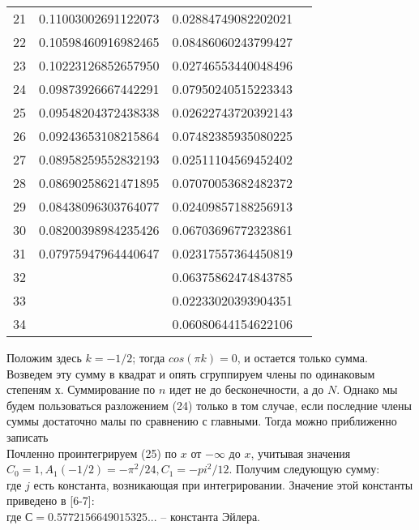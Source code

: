 \begin{table}[]
\begin{center}
\begin{tabular}{|c|c|c|c|}
21 & 0.11003002691122073 & 0.02884749082202021 &                      \\
22 & 0.10598460916982465 & 0.08486060243799427 &                      \\
23 & 0.10223126852657950 & 0.02746553440048496 &                      \\
24 & 0.09873926667442291 & 0.07950240515223343 &                      \\
25 & 0.09548204372438338 & 0.02622743720392143 &                      \\
26 & 0.09243653108215864 & 0.07482385935080225 &                      \\
27 & 0.08958259552832193 & 0.02511104569452402 &                      \\
28 & 0.08690258621471895 & 0.07070053682482372 &                      \\
29 & 0.08438096303764077 & 0.02409857188256913 &                      \\
30 & 0.08200398984235426 & 0.06703696772323861 &                      \\
31 & 0.07975947964440647 & 0.02317557364450819 &                      \\
32 &                     & 0.06375862474843785 &                      \\
33 &                     & 0.02233020393904351 &                      \\
34 &                     & 0.06080644154622106 &                      \\
\hline
\end{tabular}
\end{center}
\end{table}

\begin{equation}
\label{eq:ref_2_6_11}
\end{equation}
Положим здесь $k = -1/2$; тогда $cos(\pi k) = 0$, и остается только сумма. Возведем
эту сумму в квадрат и опять сгруппируем члены по одинаковым степеням $х$.
Суммирование по $n$ идет не до бесконечности, а до $N$. Однако мы будем
пользоваться разложением (24) только в том случае, если последние члены
суммы достаточно малы по сравнению с главными. Тогда можно приближенно
записать
\begin{equation}
\label{eq:ref_2_6_12}
\end{equation}
Почленно проинтегрируем (25) по $x$ от $-\infty$ до $x$, учитывая значения
$C_0=1, A_1(-1/2)=-\pi^2/24, C_1=-pi^2/12$. Получим следующую сумму:
\begin{equation}
\label{eq:ref_2_6_13}
\end{equation}
где $j$ есть константа, возникающая при интегрировании. Значение этой
константы приведено в [6-7]:
\begin{equation}
\label{eq:ref_2_6_14}
\end{equation}
где $С = 0.5772156649015325...$ – константа Эйлера.

